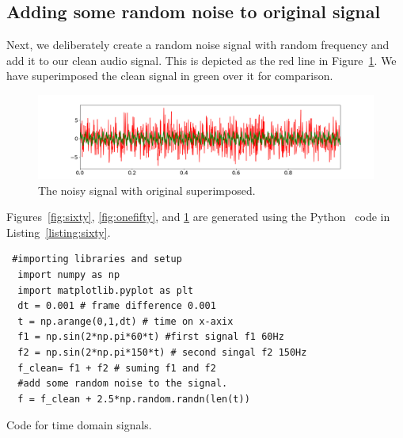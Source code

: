 \documentclass[a4paper, 12pt]{scrartcl}
\begin{document}
\subsection{Adding some random noise to original signal}

Next, we deliberately create a random noise signal with random frequency and add it to our clean audio signal.
This is depicted as the red line in Figure~\ref{fig:original_noisy}.
We have superimposed the clean signal in green over it for comparison.
\begin{figure}[H] 
  \centering
  \includegraphics[width=\textwidth]{img/original_noisy.png}
  \caption{The noisy signal with original superimposed.}
  \label{fig:original_noisy}
\end{figure}
Figures~\ref{fig:sixty}, \ref{fig:onefifty}, and \ref{fig:original_noisy} are generated using the Python~\cite{fftnumpy} code in Listing~\ref{listing:sixty}.

\begin{listing}[h]
  \begin{verbatim}
 #importing libraries and setup
  import numpy as np
  import matplotlib.pyplot as plt
  dt = 0.001 # frame difference 0.001
  t = np.arange(0,1,dt) # time on x-axix
  f1 = np.sin(2*np.pi*60*t) #first signal f1 60Hz
  f2 = np.sin(2*np.pi*150*t) # second singal f2 150Hz
  f_clean= f1 + f2 # suming f1 and f2
  #add some random noise to the signal.
  f = f_clean + 2.5*np.random.randn(len(t))
  \end{verbatim}
  \caption{Code for time domain signals.}
  \label{listing:sixty}
  \end{listing}
  
\end{document}
